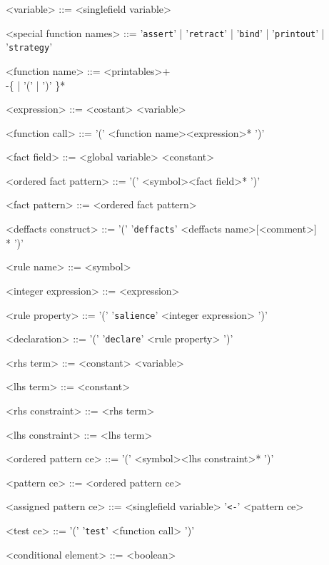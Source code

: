 \begin{grammar}
{%

<variable> ::= <singlefield variable>

<special function names> ::= '\verb!assert!' | '\verb!retract!' | '\verb!bind!' | '\verb!printout!' | '\verb!strategy!'

<function name> ::= <printables>+\\-\{<special function names> | '(' | ')' \}*

<expression> ::= <costant>
\alt<variable>

<function call> ::= '(' <function name><expression>* ')'

<fact field> ::= <global variable>
\alt<constant>

<ordered fact pattern> ::= '(' <symbol><fact field>* ')'

<fact pattern> ::= <ordered fact pattern>

<deffacts construct> ::= '(' '\verb!deffacts!' <deffacts name>[<comment>]\\<fact pattern>* ')'

<rule name> ::= <symbol>

<integer expression> ::= <expression>

<rule property> ::= '(' '\verb!salience!' <integer expression> ')'

<declaration> ::= '(' '\verb!declare!' <rule property>  ')'

<rhs term> ::= <constant>
\alt <variable>

<lhs term> ::= <constant>

<rhs constraint> ::= <rhs term>

<lhs constraint> ::= <lhs term>

<ordered pattern ce> ::= '(' <symbol><lhs constraint>* ')'

<pattern ce> ::= <ordered pattern ce>

<assigned pattern ce> ::= <singlefield variable> '\verb!<-!' <pattern ce>

<test ce> ::= '(' '\verb!test!' <function call>  ')'




<conditional element> ::= <boolean>

}
\end{grammar}

